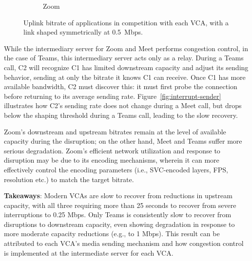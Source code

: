 \begin{figure}[t!]
\begin{subfigure}[t]{.33\textwidth}
        \caption{Zoom}
        \label{fig:zoom_ul_box}
    \end{subfigure}
    \caption{Uplink bitrate of applications in competition with each VCA, with a link shaped symmetrically at 0.5~Mbps.}
    \label{fig:boxplot-upld}
\end{figure}



While the intermediary server for Zoom and Meet performs congestion control,
in the case of Teams, this intermediary server acts only as a relay. During a
Teams call, C2 will recognize C1 has limited downstream capacity and adjust
its sending behavior, sending at only the bitrate it knows C1 can receive.
Once C1 has more available bandwidth, C2 must discover this: it must first
probe the connection before returning to its average sending rate.
Figure~\ref{fig:interrupt-sender} illustrates how C2's sending rate does not
change during a Meet call, but drops below the shaping threshold during a
Teams call, leading to the slow recovery.

Zoom's downstream and upstream bitrates remain at the level of available
capacity during the disruption; on the other hand, Meet and Teams suffer more
serious degradation. Zoom's efficient network utilization and response to
disruption may be due to its encoding mechanisms, wherein it can more
effectively control the encoding parameters (i.e., SVC-encoded layers, FPS,
resolution etc.) to match the target bitrate.  

\begin{mdframed}[roundcorner=5pt, backgroundcolor=black!10] \noindent
    \textbf{Takeaways}: Modern VCAs are slow to recover from reductions in upstream 
    capacity, with all three requiring more than 25 seconds to recover from severe
    interruptions to 0.25 Mbps. Only Teams is consistently slow to recover
    from disruptions to downstream capacity, even showing degradation in
    response to more moderate capacity reductions (e.g., to 1 Mbps).
    This result can be attributed to each VCA's media sending mechanism and how
    congestion control is implemented at the intermediate server for each VCA. 
\end{mdframed}


